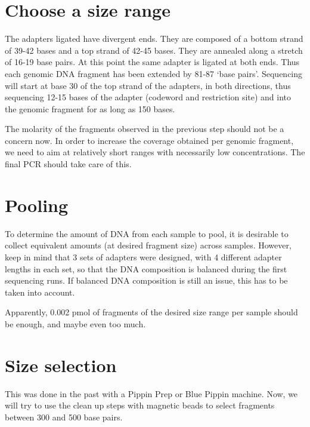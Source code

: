 \documentclass[a4paper,12pt]{article}
\begin{document}
\section{Choose a size range}
The adapters ligated have divergent ends. They are composed of a bottom strand of 39-42 bases and a top strand of 42-45 bases. They are annealed along a stretch of 16-19 base pairs. At this point the same adapter is ligated at both ends. Thus each genomic DNA fragment has been extended by 81-87 `base pairs'. Sequencing will start at base 30 of the top strand of the adapters, in both directions, thus sequencing 12-15 bases of the adapter (codeword and restriction site) and into the genomic fragment for as long as 150 bases. %

The molarity of the fragments observed in the previous step should not be a concern now. In order to increase the coverage obtained per genomic fragment, we need to aim at relatively short ranges with necessarily low concentrations. The final PCR should take care of this.

\section{Pooling}
To determine the amount of DNA from each sample to pool, it is desirable to collect equivalent amounts (at desired fragment size) across samples. However, keep in mind that 3 sets of adapters were designed, with 4 different adapter lengths in each set, so that the DNA composition is balanced during the first sequencing runs. If balanced DNA composition is still an issue, this has to be taken into account.

Apparently, 0.002 pmol of fragments of the desired size range per sample should be enough, and maybe even too much.

\section{Size selection}
This was done in the past with a Pippin Prep or Blue Pippin machine. Now, we will try to use the clean up steps with magnetic beads to select fragments between 300 and 500 base pairs. 
\end{document}
